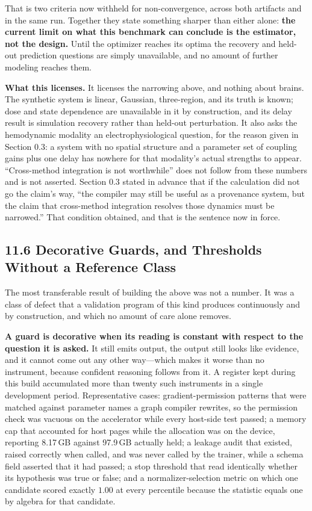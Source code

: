 That is two criteria now withheld for non-convergence, across both artifacts and
in the same run. Together they state something sharper than either alone:
\textbf{the current limit on what this benchmark can conclude is the estimator,
not the design.} Until the optimizer reaches its optima the recovery and
held-out prediction questions are simply unavailable, and no amount of further
modeling reaches them.

\textbf{What this licenses.} It licenses the narrowing above, and nothing about
brains. The synthetic system is linear, Gaussian, three-region, and its truth is
known; dose and state dependence are unavailable in it by construction, and its
delay result is simulation recovery rather than held-out perturbation. It also
asks the hemodynamic modality an electrophysiological question, for the reason
given in Section 0.3: a system with no spatial structure and a parameter set of
coupling gains plus one delay has nowhere for that modality's actual strengths
to appear. ``Cross-method integration is not worthwhile'' does not follow from
these numbers and is not asserted. Section
0.3 stated in advance that if the calculation did not go the claim's way, ``the
compiler may still be useful as a provenance system, but the claim that
cross-method integration resolves those dynamics must be narrowed.'' That
condition obtained, and that is the sentence now in force.

\subsection{11.6 Decorative Guards, and Thresholds Without a Reference Class}

The most transferable result of building the above was not a number. It was a
class of defect that a validation program of this kind produces continuously and
by construction, and which no amount of care alone removes.

\textbf{A guard is decorative when its reading is constant with respect to the
question it is asked.} It still emits output, the output still looks like
evidence, and it cannot come out any other way---which makes it worse than no
instrument, because confident reasoning follows from it. A register kept during
this build accumulated more than twenty such instruments in a single
development period. Representative cases: gradient-permission patterns that were
matched against parameter names a graph compiler rewrites, so the permission
check was vacuous on the accelerator while every host-side test passed; a memory
cap that accounted for host pages while the allocation was on the device,
reporting 8.17\,GB against 97.9\,GB actually held; a leakage audit that existed,
raised correctly when called, and was never called by the trainer, while a
schema field asserted that it had passed; a stop threshold that read identically
whether its hypothesis was true or false; and a normalizer-selection metric on
which one candidate scored exactly \(1.00\) at every percentile because the
statistic equals one by algebra for that candidate.

